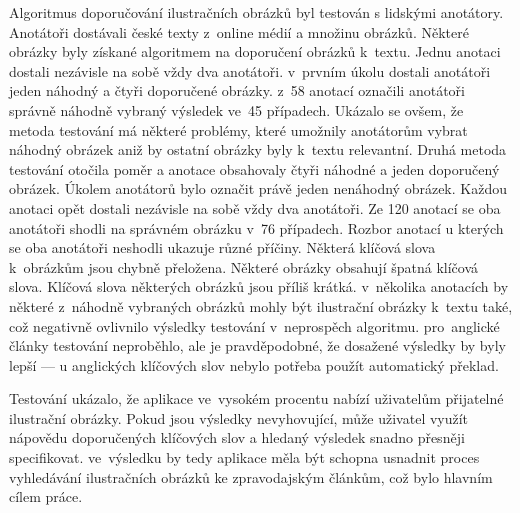 Algoritmus doporučování ilustračních obrázků byl testován s lidskými anotátory. Anotátoři dostávali české texty z~online médií a množinu obrázků. Některé obrázky byly získané algoritmem na doporučení obrázků k~textu. Jednu anotaci dostali nezávisle na sobě vždy dva anotátoři. v~prvním úkolu dostali anotátoři jeden náhodný a čtyři doporučené obrázky. z~58 anotací označili anotátoři správně náhodně vybraný výsledek ve~45 případech. Ukázalo se ovšem, že metoda testování má některé problémy, které umožnily anotátorům vybrat náhodný obrázek aniž by ostatní obrázky byly k~textu relevantní. Druhá metoda testování otočila poměr a anotace obsahovaly čtyři náhodné a jeden doporučený obrázek. Úkolem anotátorů bylo označit právě jeden nenáhodný obrázek. Každou anotaci opět dostali nezávisle na sobě vždy dva anotátoři. Ze 120 anotací se oba anotátoři shodli na správném obrázku v~76 případech. Rozbor anotací u kterých se oba anotátoři neshodli ukazuje různé příčiny. Některá klíčová slova k~obrázkům jsou chybně přeložena. Některé obrázky obsahují špatná klíčová slova. Klíčová slova některých obrázků jsou příliš krátká. v~několika anotacích by některé z~náhodně vybraných obrázků mohly být ilustrační obrázky k~textu také, což negativně ovlivnilo výsledky testování v~neprospěch algoritmu. pro~anglické články testování neproběhlo, ale je pravděpodobné, že dosažené výsledky by byly lepší --- u anglických klíčových slov nebylo potřeba použít automatický překlad.

Testování ukázalo, že aplikace ve~vysokém procentu nabízí uživatelům přijatelné ilustrační obrázky. Pokud jsou výsledky nevyhovující, může uživatel využít nápovědu doporučených klíčových slov a hledaný výsledek snadno přesněji specifikovat. ve~výsledku by tedy aplikace měla být schopna usnadnit proces vyhledávání ilustračních obrázků ke zpravodajským článkům, což bylo hlavním cílem práce.

